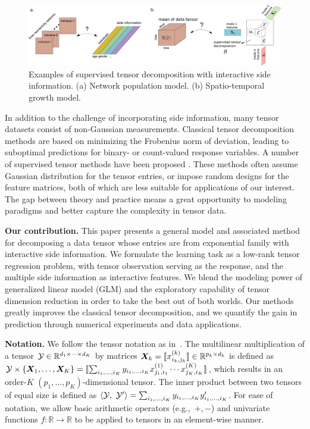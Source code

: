 \documentclass{article}
\theoremstyle{definition}
\theoremstyle{definition}
\begin{document}
 \begin{figure}[hbt]
 \vspace{-.4cm}
\begin{center}
\includegraphics[width = 13.5cm]{demo.pdf}
\vspace{-.4cm}
\end{center}
\caption{Examples of supervised tensor decomposition with interactive side information. (a) Network population model. (b) Spatio-temporal growth model.} \label{fig:intro1}
\vspace{-.2cm}
\end{figure}

In addition to the challenge of incorporating side information, many tensor datasets consist of non-Gaussian measurements. Classical tensor decomposition methods are based on minimizing the Frobenius norm of deviation, leading to suboptimal predictions for binary- or count-valued response variables. A number of supervised tensor methods have been proposed \citep{narita2012tensor, zhao2012higher, yu2016learning,lock2018supervised}. These methods often assume Gaussian distribution for the tensor entries, or impose random designs for the feature matrices, both of which are less suitable for applications of our interest. The gap between theory and practice means a great opportunity to modeling paradigms and better capture the complexity in tensor data. 

{\bf Our contribution.} This paper presents a general model and associated method for decomposing a data tensor whose entries are from exponential family with interactive side information. We formulate the learning task as a low-rank tensor regression problem, with tensor observation serving as the response, and the multiple side information as interactive features. We blend the modeling power of generalized linear model (GLM) and the exploratory capability of tensor dimension reduction in order to take the best out of both worlds. Our methods greatly improves the classical tensor decomposition, and we quantify the gain in prediction through numerical experiments and data applications. 

{\bf Notation.} We follow the tensor notation as in~\cite{kolda2009tensor}. The multilinear multiplication of a tensor $\mathcal{Y}\in\mathbb{R}^{d_1\times \cdots\times d_K}$ by matrices $\bm X_k=\llbracket x_{i_k,j_k}^{(k)} \rrbracket\in\mathbb{R}^{p_k\times d_k}$ is defined as $\mathcal{Y}\times\{\bm X_1,\ldots,\bm X_K\} =\llbracket \sum_{i_1,\ldots,i_K}y_{i_1,\ldots,i_K}x_{j_1,i_1}^{(1)}\cdots x_{j_K,i_K}^{(K)} \rrbracket$,
which results in an order-$K$ $(p_1,\ldots,p_K)$-dimensional tensor. The inner product between two tensors of equal size is defined as $\langle \mathcal{Y},\ \mathcal{Y}'\rangle =\sum_{i_1,\ldots,i_K}y_{i_1,\ldots,i_K}y'_{i_1,\ldots,i_K}$. For ease of notation, we allow basic arithmetic operators (e.g.,\ $+, -$) and univariate functions $f\colon \mathbb{R}\to \mathbb{R}$ to be applied to tensors in an element-wise manner. 
\end{document}
